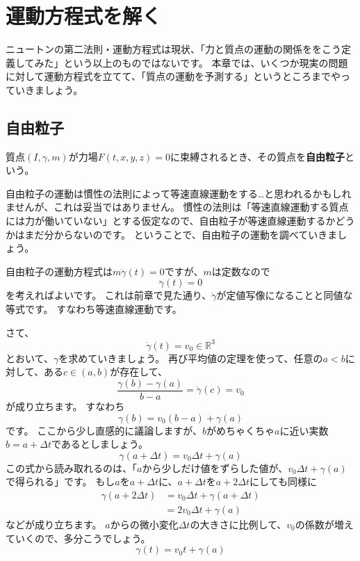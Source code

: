 \chapter{運動方程式を解く}

ニュートンの第二法則・運動方程式は現状、「力と質点の運動の関係ををこう定義してみた」という以上のものではないです。
本章では、いくつか現実の問題に対して運動方程式を立てて、「質点の運動を予測する」というところまでやっていきましょう。



\section{自由粒子}

\begin{definition}[自由粒子]
  質点$(I,\gamma,m)$が力場$F(t,x,y,z)=0$に束縛されるとき、その質点を\textbf{自由粒子}という。
\end{definition}

自由粒子の運動は慣性の法則によって等速直線運動をする…と思われるかもしれませんが、これは妥当ではありません。
慣性の法則は「等速直線運動する質点には力が働いていない」とする仮定なので、自由粒子が等速直線運動するかどうかはまだ分からないのです。
ということで、自由粒子の運動を調べていきましょう。

自由粒子の運動方程式は$m\ddot\gamma(t)=0$ですが、$m$は定数なので
\[
  \ddot\gamma(t)=0
\]
を考えればよいです。
これは前章で見た通り、$\dot\gamma$が定値写像になることと同値な等式です。
すなわち等速直線運動です。

さて、
\[
  \dot\gamma(t)=v_0\in\mathbb{R}^3
\]
とおいて、$\gamma$を求めていきましょう。
再び平均値の定理を使って、任意の$a<b$に対して、ある$c\in(a,b)$が存在して、
\[
  \frac{\gamma(b)-\gamma(a)}{b-a}=\dot\gamma(c)=v_0
\]
が成り立ちます。
すなわち
\[
  \gamma(b)=v_0(b-a)+\gamma(a)
\]
です。
ここから少し直感的に議論しますが、$b$がめちゃくちゃ$a$に近い実数$b=a+\Delta t$であるとしましょう。
\[
  \gamma(a+\Delta t)=v_0\Delta t+\gamma(a)
\]
この式から読み取れるのは、「$a$から少しだけ値をずらした値が、$v_0\Delta t+\gamma(a)$で得られる」です。
もし$a$を$a+\Delta t$に、$a+\Delta t$を$a+2\Delta t$にしても同様に
\begin{align*}
  \gamma(a+2\Delta t)&=v_0\Delta t+\gamma(a+\Delta t)\\
  &=2v_0\Delta t+\gamma(a)
\end{align*}
などが成り立ちます。
$a$からの微小変化$\Delta t$の大きさに比例して、$v_0$の係数が増えていくので、多分こうでしょう。
\[
  \gamma(t)=v_0t+\gamma(a)
\]

